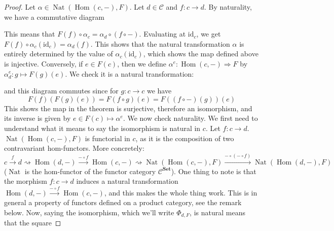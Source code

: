 \documentclass{article}
\newcommand{\id}{\mathrm{id}}
\newcommand{\cat}{\mathcal{C}}
\newcommand{\Set}{\mathbf{Set}}
\DeclareMathOperator{\Hom}{Hom}
\DeclareMathOperator{\Nat}{Nat}
\theoremstyle{plain}
\theoremstyle{definition}
\theoremstyle{remark}
\begin{document}
\begin{proof}
    Let $\alpha \in \Nat(\Hom(c,-),F)$. Let $d \in \cat$ and $f : c \to d$. By naturality, we have a commutative diagram
    \begin{center}
    \end{center}
    This means that $F(f) \circ \alpha_c = \alpha_d \circ (f\circ -)$. Evaluating at $\id_c$, we get $F(f) \circ \alpha_c(\id_c) = \alpha_d(f)$. This shows that the natural transformation $\alpha$ is entirely determined by the value of $\alpha_c(\id_c)$, which shows the map defined above is injective. Conversely, if $e \in F(c)$, then we define $\alpha^e : \Hom(c,-) \Rightarrow F$ by $\alpha_d^e : g \mapsto F(g)(e)$. We check it is a natural transformation:
    \begin{center}
    \end{center}
    and this diagram commutes since for $g : c\to c$ we have
    \[F(f)(F(g)(e)) = F(f \circ g)(e) = F((f\circ -)(g))(e)\]
    This shows the map in the theorem is surjective, therefore an isomorphism, and its inverse is given by $e \in F(c) \mapsto \alpha^e$.
    We now check naturality. We first need to understand what it means to say the isomorphism is natural in $c$. Let $f : c \to d$. $\Nat(\Hom(c,-),F)$ is functorial in $c$, as it is the composition of two contravariant hom-functors. More concretely:
    \[c \xrightarrow{f} d \rightsquigarrow \Hom(d,-) \xrightarrow{- \circ f}\Hom(c,-) \rightsquigarrow \Nat(\Hom(c,-),F) \xrightarrow{- \circ (- \circ f)} \Nat(\Hom(d,-),F)\]
    ($\Nat$ is the hom-functor of the functor category $\cat^\Set$). One thing to note is that the morphism $f : c\to d$ induces a natural transformation $\Hom(d,-) \xrightarrow{-\circ f} \Hom(c,-)$, and this makes the whole thing work. This is in general a property of functors defined on a product category, see the remark below. Now, saying the isomorphism, which we'll write $\Phi_{d,F}$, is natural means that the square

\end{proof}
\end{document}
